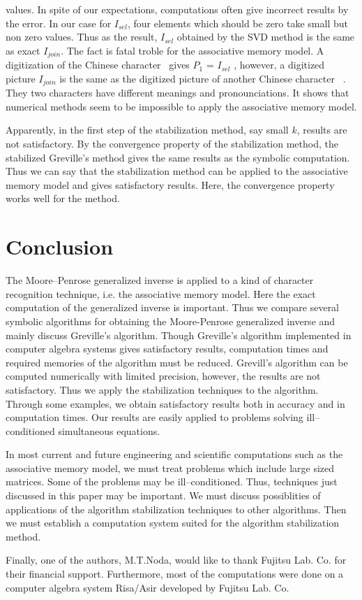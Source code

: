 values.  In spite of our expectations, computations often give 
incorrect results by the error.  In our case for $I_{sel } $, 
four elements which should be zero take small but non zero 
values.  
Thus as the 
result, $I_{sel} $ obtained by the SVD method 
is the same as exact $I_{join} $.  The fact is 
fatal troble for the associative memory model.  
A digitization of the Chinese character \oh \ 
gives $P_1 $ = $I_{sel} $ , however, a digitized 
picture $I_{join} $ is the same as the digitized 
picture of another Chinese character \tama \ .  
They two characters have different meanings and 
pronounciations.  It shows that numerical 
methods seem to be impossible to apply the 
associative memory model. \par
Apparently, in the first step of the stabilization 
method, say small $k $, results are not satisfactory.
By the convergence property of the stabilization 
method, the stabilized Greville's method gives the same 
results as the symbolic computation.  Thus we can 
say that the stabilization method can be applied to
the associative memory model and gives satisfactory 
results.  Here, the convergence property 
works well for the method.

\section{Conclusion}

The Moore--Penrose generalized inverse is applied 
to a kind of character recognition technique, i.e. the 
associative memory model.  Here the exact computation 
of the generalized inverse is important.  Thus we 
compare several symbolic algorithms for obtaining the 
Moore-Penrose generalized inverse and mainly discuss 
Greville's algorithm.  Though Greville's 
algorithm implemented in computer algebra systems 
gives satisfactory results, computation times and 
required memories of the algorithm must be reduced.  
Grevill's algorithm can be computed numerically 
with limited precision, however, the results are not 
satisfactory.  Thus we apply the stabilization 
techniques to the algorithm.    
Through some examples, we obtain satisfactory 
results both in accuracy and in computation 
times.  Our results are easily applied to problems 
solving ill--conditioned simultaneous equations. \par
In most current and future engineering and 
scientific computations such as the associative 
memory model, we must treat problems which include 
large sized matrices.  Some of the problems may be 
ill--conditioned.  Thus, techniques just discussed 
in this paper may be important.  We must discuss 
possiblities of applications of the algorithm 
stabilization techniques to other algorithms.  Then 
we must establish a computation system suited for 
the algorithm stabilization method. \par
Finally, one of the authors, M.T.Noda, would like 
to thank Fujitsu Lab. Co. for their financial 
support.  Furthermore, most of the 
computations were done on a computer algebra 
system Risa/Asir developed by Fujitsu Lab. Co. 
\ \\
\appendix


